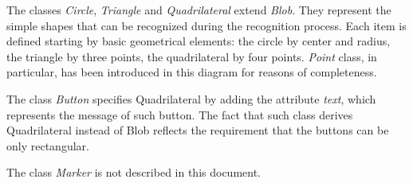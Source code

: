		The classes \emph{Circle}, \emph{Triangle} and \emph{Quadrilateral} extend \emph{Blob}. They represent the simple shapes that can be recognized during the recognition process. Each item is defined starting by basic geometrical elements: the circle by center and radius, the triangle by three points, the quadrilateral by four points. \emph{Point} class, in particular, has been introduced in this diagram for reasons of completeness. 

		The class \emph{Button} specifies Quadrilateral by adding the attribute \emph{text}, which represents the message of such button. The fact that such class derives Quadrilateral instead of Blob reflects the requirement that the buttons can be only rectangular. 
	
		The class \emph{Marker} is not described in this document. 
	
